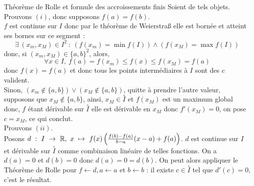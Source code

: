 \documentclass{article}
\begin{document}
\begin{question_kholle}
    [Soient $(a,b)\in \R ^2$ tels que $a<b$. Soit $I$ le segment $a,b$.
    \\
    Soit $f \ : \ I \ \to \ \R $ continue sur ledit segment et dérivable sur l'ouvert associé.\\
    \newline
    $(i)$ Théroème de Rolle :
   \\ Si $f(a) = f(b)$, alors $\exists \ c \in \overset{\circ}{I}$ tel que $f'(c) =0$ 
    \\ 
    \newline
    $(ii)$ Formule des accroissements finis : \\
    $\exists \ c \in \overset{\circ}{I} \ : \ f'(c) = \frac{f(b)-f(a)}{b-a}.$
    ]
    {Théorème de Rolle et formule des accroissements finis}
    Soient de tels objets. \\
    Prouvons $(i)$, donc supposons $f(a) = f(b)$. \\
    $f$ est continue sur $I$ donc par le théorème de Weierstraß elle est bornée et atteint ses bornes sur ce segment : 
    \\
    $$\exists \ (x_m, x_M)\in I^2 \ : \ (f(x_m) = \min f(I)) \wedge (f(x_M) = \max f(I))$$
    donc, si $(x_m, x_M)\in \{a,b\}^2$, alors, 
    $$\forall x \in I, \ f(a)=f(x_m) \leq f(x) \leq f(x_M)=f(a)$$
    donc $f(x) = f(a)$ et donc tous les points intermédiaires à $I$ sont des $c$ valident.\\ Sinon, $(x_m \notin\{a,b\})\vee (x_M\notin\{a,b\}) $, quitte à prendre l'autre valeur, supposons que $x_M\notin \{a,b\}$, ainsi, $x_M \in \overset{\circ}{I}$ et $f(x_M)$ est un maximum global donc, $f$ étant dérivable sur $\overset{\circ}{I}$ elle est dérivable en $x_M$ donc $f'(x_M)=0$, on pose $c = x_M$, ce qui conclut. \\
    \newline
    Prouvons $(ii)$.\\
    Posons $d \ :\ I \ \to \ \R, \ x \ \mapsto \ f(x) \left( \frac{f(b)-f(a)}{b-a}(x-a) +f(a) \right) $. $d$ est continue sur $I$ et dérivable sur $\overset{\circ}{I}$ comme combinaison linéaire de telles fonctions. On a $d(a) = 0$ et $d(b) = 0$ donc $d(a) = 0 = d(b)$. On peut alors appliquer le Théorème de Rolle pour $f \gets d, a \gets a $ et $ b \gets b$ : il existe $c\in \overset{\circ}{I}$ tel que $d'(c) = 0$, c'est le résultat.
\end{question_kholle}
\end{document}
